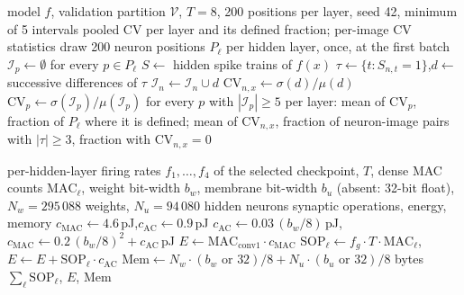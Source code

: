 \begin{algorithm}[htbp]
\caption{Coefficient of variation of the inter-spike intervals}
\label{alg:cvisi}
\begin{algorithmic}[1]
\REQUIRE model $f$, validation partition $\mathcal{V}$, $T = 8$, 200 positions
         per layer, seed 42, minimum of 5 intervals
\ENSURE  pooled CV per layer and its defined fraction; per-image CV statistics
\STATE draw 200 neuron positions $P_\ell$ per hidden layer, once, at the first batch
\STATE $\mathcal{I}_p \gets \emptyset$ for every $p \in P_\ell$
  \STATE $S \gets$ hidden spike trains of $f(x)$
    \STATE $\tau \gets \{t : S_{n,t} = 1\}$,\quad $d \gets$ successive differences of $\tau$
      \STATE $\mathcal{I}_n \gets \mathcal{I}_n \cup d$ 
    \ENDIF
      \STATE $\mathrm{CV}_{n,x} \gets \sigma(d) / \mu(d)$ 
    \ENDIF
  \ENDFOR
\ENDFOR
\STATE $\mathrm{CV}_p \gets \sigma(\mathcal{I}_p) / \mu(\mathcal{I}_p)$ for every
       $p$ with $|\mathcal{I}_p| \geq 5$
\RETURN per layer: mean of $\mathrm{CV}_p$, fraction of $P_\ell$ where it is
        defined; mean of $\mathrm{CV}_{n,x}$, fraction of neuron-image pairs
        with $|\tau| \geq 3$, fraction with $\mathrm{CV}_{n,x} = 0$
\end{algorithmic}
\end{algorithm}

\begin{algorithm}[htbp]
\caption{Energy and memory of one operating point}
\label{alg:energy}
\begin{algorithmic}[1]
\REQUIRE per-hidden-layer firing rates $f_1, \dots, f_4$ of the selected
         checkpoint, $T$, dense MAC counts $\mathrm{MAC}_\ell$, weight bit-width
         $b_w$, membrane bit-width $b_u$ (absent: 32-bit float), $N_w = 295\,088$
         weights, $N_u = 94\,080$ hidden neurons
\ENSURE  synaptic operations, energy, memory
  \STATE $c_{\mathrm{MAC}} \gets 4.6$\,pJ,\quad $c_{\mathrm{AC}} \gets 0.9$\,pJ
\ELSE
  \STATE $c_{\mathrm{AC}} \gets 0.03\,(b_w/8)$\,pJ,\quad
         $c_{\mathrm{MAC}} \gets 0.2\,(b_w/8)^2 + c_{\mathrm{AC}}$\,pJ
\ENDIF
\STATE $E \gets \mathrm{MAC}_{\mathrm{conv1}} \cdot c_{\mathrm{MAC}}$
  \STATE $\mathrm{SOP}_\ell \gets f_g \cdot T \cdot \mathrm{MAC}_\ell$,\quad
         $E \gets E + \mathrm{SOP}_\ell \cdot c_{\mathrm{AC}}$
\ENDFOR
\STATE $\mathrm{Mem} \gets N_w \cdot (b_w \text{ or } 32)/8 + N_u \cdot (b_u \text{ or } 32)/8$ bytes
\RETURN $\sum_\ell \mathrm{SOP}_\ell$, $E$, $\mathrm{Mem}$
\end{algorithmic}
\end{algorithm}

